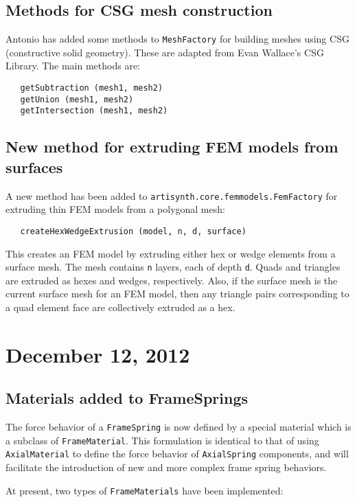 \documentclass{article}
\begin{document}
\subsection*{Methods for CSG mesh construction}

Antonio has added some methods to {\tt MeshFactory} for building
meshes using CSG (constructive solid geometry). These are adapted from
Evan Wallace's CSG Library. The main methods are:
\begin{lstlisting}
   getSubtraction (mesh1, mesh2)
   getUnion (mesh1, mesh2)
   getIntersection (mesh1, mesh2)
\end{lstlisting}

\subsection*{New method for extruding FEM models from surfaces}

A new method has been added to {\tt artisynth.core.femmodels.FemFactory}
for extruding thin FEM models from a polygonal mesh:
\begin{lstlisting}
   createHexWedgeExtrusion (model, n, d, surface)
\end{lstlisting}
This creates an FEM model by extruding either hex or wedge elements
from a surface mesh. The mesh contains {\tt n} layers, each of depth
{\tt d}. Quads and triangles are extruded as hexes and wedges,
respectively.  Also, if the surface mesh is the current surface mesh
for an FEM model, then any triangle pairs corresponding to a quad
element face are collectively extruded as a hex.

\section*{December 12, 2012}

\subsection*{Materials added to FrameSprings}

The force behavior of a {\tt FrameSpring} is now defined by a special
material which is a subclass of {\tt FrameMaterial}. This formulation
is identical to that of using {\tt AxialMaterial} to define the force
behavior of {\tt AxialSpring} components, and will facilitate the
introduction of new and more complex frame spring behaviors.

At present, two types of {\tt FrameMaterials} have been implemented:
\end{document}

